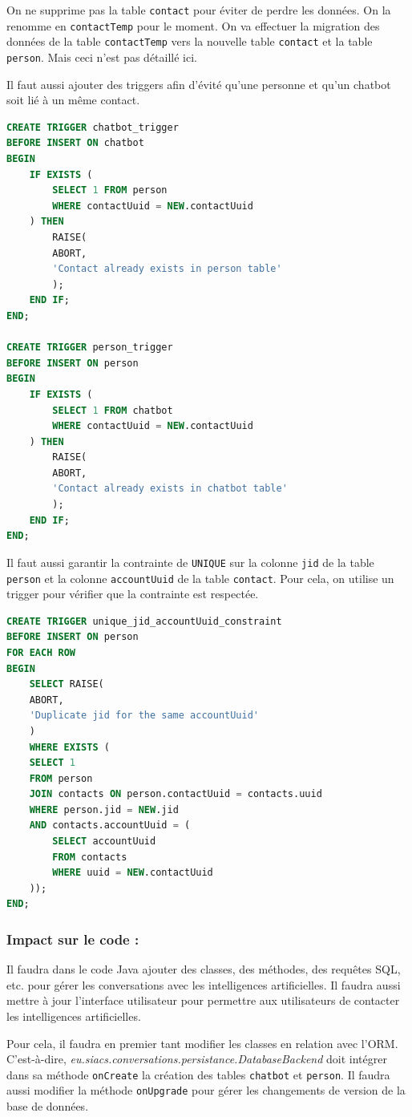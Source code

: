 \documentclass[a4paper,11pt]{article}
\begin{document}
On ne supprime pas la table \texttt{contact} pour éviter de perdre les données. On la renomme en \texttt{contactTemp} pour le moment. On va effectuer la migration des données de la table \texttt{contactTemp} vers la nouvelle table \texttt{contact} et la table \texttt{person}. Mais ceci n'est pas détaillé ici.

Il faut aussi ajouter des triggers afin d'évité qu'une personne et qu'un chatbot soit lié à un même contact.

\begin{lstlisting}[language=SQL]
CREATE TRIGGER chatbot_trigger
BEFORE INSERT ON chatbot
BEGIN
	IF EXISTS (
		SELECT 1 FROM person 
		WHERE contactUuid = NEW.contactUuid
	) THEN
		RAISE(
		ABORT, 
		'Contact already exists in person table'
		);
	END IF;
END;

CREATE TRIGGER person_trigger
BEFORE INSERT ON person
BEGIN
	IF EXISTS (
		SELECT 1 FROM chatbot
		WHERE contactUuid = NEW.contactUuid
	) THEN
		RAISE(
		ABORT,
		'Contact already exists in chatbot table'
		);
	END IF;
END;
\end{lstlisting}

Il faut aussi garantir la contrainte de \texttt{UNIQUE} sur la colonne \texttt{jid} de la table \texttt{person} et la colonne \texttt{accountUuid} de la table \texttt{contact}. Pour cela, on utilise un trigger pour vérifier que la contrainte est respectée.

\begin{lstlisting}[language=SQL]
CREATE TRIGGER unique_jid_accountUuid_constraint
BEFORE INSERT ON person
FOR EACH ROW
BEGIN
	SELECT RAISE(
	ABORT,
	'Duplicate jid for the same accountUuid'
	) 
	WHERE EXISTS (
	SELECT 1 
	FROM person
	JOIN contacts ON person.contactUuid = contacts.uuid
	WHERE person.jid = NEW.jid
	AND contacts.accountUuid = (
		SELECT accountUuid 
		FROM contacts 
		WHERE uuid = NEW.contactUuid
	));
END;
\end{lstlisting}

\subsubsection*{Impact sur le code :}

Il faudra dans le code Java ajouter des classes, des méthodes, des requêtes SQL, etc. pour gérer les conversations avec les intelligences artificielles. Il faudra aussi mettre à jour l'interface utilisateur pour permettre aux utilisateurs de contacter les intelligences artificielles.

Pour cela, il faudra en premier tant modifier les classes en relation avec l'ORM. C'est-à-dire, \textit{eu.siacs.conversations.persistance.DatabaseBackend} doit intégrer dans sa méthode \texttt{onCreate} la création des tables \texttt{chatbot} et \texttt{person}. Il faudra aussi modifier la méthode \texttt{onUpgrade} pour gérer les changements de version de la base de données.
\end{document}
